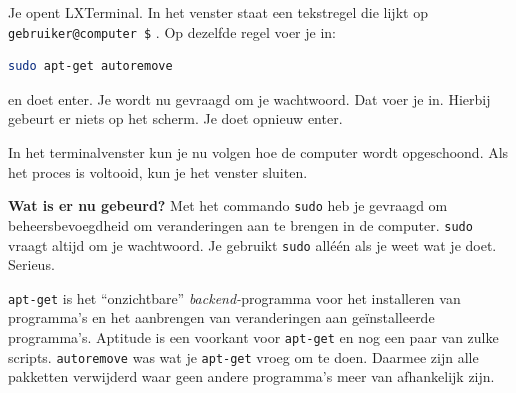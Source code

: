 \documentclass[12pt,a4paper]{article}
\begin{document}
Je opent LXTerminal. In het venster staat een tekstregel die lijkt op \texttt{gebruiker@computer~\$} . Op dezelfde regel voer je in:

\begin{lstlisting}[language=bash]
sudo apt-get autoremove
\end{lstlisting}

\noindent en doet enter. Je wordt nu gevraagd om je wachtwoord. Dat voer je in. Hierbij gebeurt er niets op het scherm. Je doet opnieuw enter. 

In het terminalvenster kun je nu volgen hoe de computer wordt opgeschoond. Als het proces is voltooid, kun je het venster sluiten. 
\vspace{1em}

\noindent \textbf{Wat is er nu gebeurd?} Met het commando \texttt{sudo} heb je gevraagd om beheersbevoegdheid om veranderingen aan te brengen in de computer. \texttt{sudo} vraagt altijd om je wachtwoord. Je gebruikt \texttt{sudo} all\'{e}\'{e}n als je weet wat je doet. Serieus. 

\texttt{apt-get} is het ``onzichtbare'' \textit{backend-}programma voor het installeren van programma's en het  aanbrengen van veranderingen aan ge\"{i}nstalleerde programma's. Aptitude is een voorkant voor \texttt{apt-get} en nog een paar van zulke scripts. \texttt{autoremove} was wat je \texttt{apt-get} vroeg om te doen. Daarmee zijn alle pakketten verwijderd waar geen andere programma's meer van afhankelijk zijn.
\end{document}
